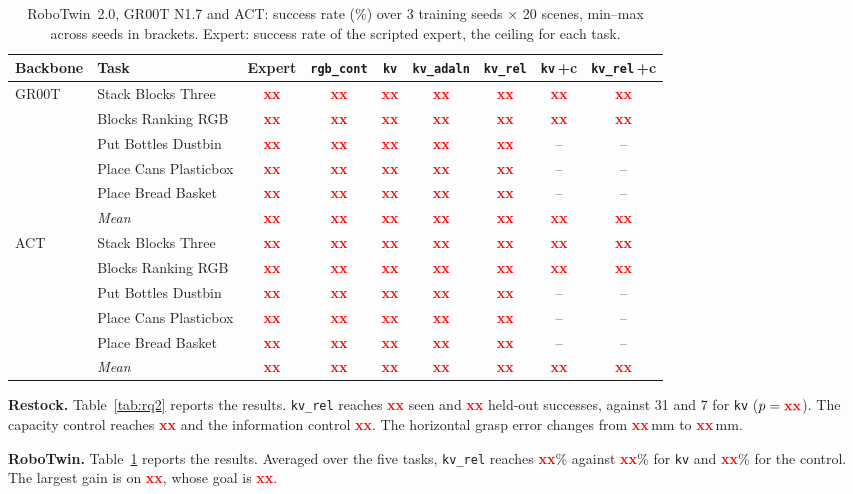 \documentclass[letterpaper, 10pt, journal, twoside]{IEEEtran}
\newcommand{\tbd}[1][]{\textcolor{red}{\textbf{xx}#1}}
\newcommand{\arm}[1]{\texttt{#1}}
\begin{document}
\begin{table}[t]
\centering
\caption{RoboTwin~2.0, GR00T N1.7 and ACT: success rate (\%) over 3
training seeds $\times$ 20 scenes, min--max across seeds in brackets.
Expert: success rate of the scripted expert, the ceiling for each task.}
\label{tab:robotwin-results}
\footnotesize
\setlength{\tabcolsep}{3.5pt}
\begin{tabular}{@{}llccccccc@{}}
\toprule
Backbone & Task & Expert & \arm{rgb\_cont} & \arm{kv} & \arm{kv\_adaln} & \arm{kv\_rel} & \arm{kv}\,+c & \arm{kv\_rel}\,+c \\
\midrule
\multirow{6}{*}{GR00T}
 & Stack Blocks Three    & \tbd & \tbd & \tbd & \tbd & \tbd & \tbd & \tbd \\
 & Blocks Ranking RGB    & \tbd & \tbd & \tbd & \tbd & \tbd & \tbd & \tbd \\
 & Put Bottles Dustbin   & \tbd & \tbd & \tbd & \tbd & \tbd & -- & -- \\
 & Place Cans Plasticbox & \tbd & \tbd & \tbd & \tbd & \tbd & -- & -- \\
 & Place Bread Basket    & \tbd & \tbd & \tbd & \tbd & \tbd & -- & -- \\
 & \textit{Mean}         & \tbd & \tbd & \tbd & \tbd & \tbd & \tbd & \tbd \\
\midrule
\multirow{6}{*}{ACT}
 & Stack Blocks Three    & \tbd & \tbd & \tbd & \tbd & \tbd & \tbd & \tbd \\
 & Blocks Ranking RGB    & \tbd & \tbd & \tbd & \tbd & \tbd & \tbd & \tbd \\
 & Put Bottles Dustbin   & \tbd & \tbd & \tbd & \tbd & \tbd & -- & -- \\
 & Place Cans Plasticbox & \tbd & \tbd & \tbd & \tbd & \tbd & -- & -- \\
 & Place Bread Basket    & \tbd & \tbd & \tbd & \tbd & \tbd & -- & -- \\
 & \textit{Mean}         & \tbd & \tbd & \tbd & \tbd & \tbd & \tbd & \tbd \\
\bottomrule
\end{tabular}
\end{table}

\textbf{Restock.} Table~\ref{tab:rq2} reports the results. \arm{kv\_rel}
reaches \tbd{} seen and \tbd{} held-out successes, against 31 and 7 for
\arm{kv} ($p=\tbd$). The capacity control reaches \tbd{} and the
information control \tbd{}. The horizontal grasp error changes from
\tbd{}\,mm to \tbd{}\,mm.

\textbf{RoboTwin.} Table~\ref{tab:robotwin-results} reports the results.
Averaged over the five tasks, \arm{kv\_rel} reaches \tbd{}\% against
\tbd{}\% for \arm{kv} and \tbd{}\% for the control. The largest gain is on
\tbd{}, whose goal is \tbd{}.
\end{document}
